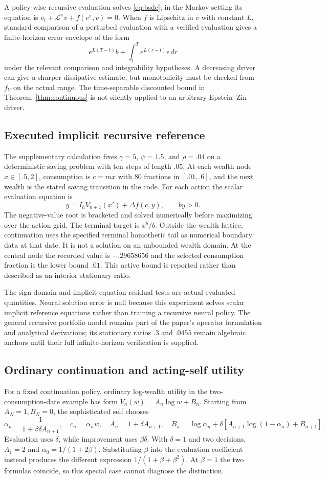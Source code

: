 A policy-wise recursive evaluation solves \eqref{eq:bsde}; in the Markov setting its equation is $v_t+\mathcal L^\pi v+f(c^\pi,v)=0$. When $f$ is Lipschitz in $v$ with constant $L$, standard comparison of a perturbed evaluation with a verified evaluation gives a finite-horizon error envelope of the form
\[
e^{L(T-t)}b+\int_t^T e^{L(r-t)}\epsilon\,dr
\]
under the relevant comparison and integrability hypotheses. A decreasing driver can give a sharper dissipative estimate, but monotonicity must be checked from $f_V$ on the actual range. The time-separable discounted bound in Theorem~\ref{thm:continuous} is not silently applied to an arbitrary Epstein--Zin driver.

\subsection{Executed implicit recursive reference}
The supplementary calculation fixes $\gamma=5$, $\psi=1.5$, and $\rho=.04$ on a deterministic saving problem with ten steps of length $.05$. At each wealth node $x\in[.5,2]$, consumption is $c=mx$ with 80 fractions in $[.01,.6]$, and the next wealth is the stated saving transition in the code. For each action the scalar evaluation equation is
\[
y=I_hV_{n+1}(x')+\Delta f(c,y),\qquad by>0.
\]
The negative-value root is bracketed and solved numerically before maximizing over the action grid. The terminal target is $x^b/b$. Outside the wealth lattice, continuation uses the specified terminal homothetic tail as numerical boundary data at that date. It is not a solution on an unbounded wealth domain. At the central node the recorded value is $-.29658656$ and the selected consumption fraction is the lower bound $.01$. This active bound is reported rather than described as an interior stationary ratio.

The sign-domain and implicit-equation residual tests are actual evaluated quantities. Neural solution error is null because this experiment solves scalar implicit reference equations rather than training a recursive neural policy. The general recursive portfolio model remains part of the paper's operator formulation and analytical derivations; its stationary ratios $.3$ and $.0455$ remain algebraic anchors until their full infinite-horizon verification is supplied.

\subsection{Ordinary continuation and acting-self utility}
For a fixed continuation policy, ordinary log-wealth utility in the two-consumption-date example has form $V_n(w)=A_n\log w+B_n$. Starting from $A_N=1,B_N=0$, the sophisticated self chooses
\[
\alpha_n=\frac{1}{1+\beta\delta A_{n+1}},\quad c_n=\alpha_n w,
\quad A_n=1+\delta A_{n+1},\quad
B_n=\log\alpha_n+\delta[A_{n+1}\log(1-\alpha_n)+B_{n+1}].
\]
Evaluation uses $\delta$, while improvement uses $\beta\delta$. With $\delta=1$ and two decisions, $A_1=2$ and $\alpha_0=1/(1+2\beta)$. Substituting $\beta$ into the evaluation coefficient instead produces the different expression $1/(1+\beta+\beta^2)$. At $\beta=1$ the two formulas coincide, so this special case cannot diagnose the distinction.


